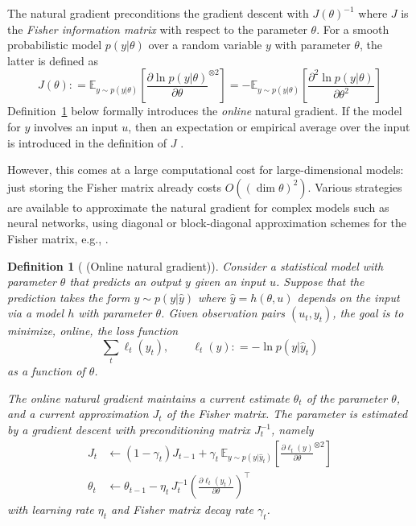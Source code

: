 \documentclass[11pt,a4paper]{article}
\newcommand{\deq}{\mathrel{\mathop{:}}=}
\newcommand{\E}{\mathbb{E}}
\newcommand{\1}{\mathbbm{1}}
\theoremstyle{yannthm}
\newtheorem{defi}{Definition}
\theoremstyle{yannthm2}
\newcommand{\transp}[1]{#1^{\!\top}\!}
\numberwithin{equation}{section}
\begin{document}
The natural gradient preconditions
the gradient descent with
$J(\theta)^{-1}$ where $J$ is the \emph{Fisher information matrix} 
\cite{Kullback} with
respect to the parameter $\theta$. For a smooth probabilistic model
$p(y|\theta)$ over a random variable $y$ with parameter $\theta$, the
latter
is defined as
\begin{equation}
J(\theta)\deq \E_{y\sim p(y|\theta)} \left[{\frac{\partial \ln
p(y|\theta)}{\partial \theta}}^{\otimes 2}\right]=-\E_{y\sim
p(y|\theta)}\left[
\frac{\partial^2\ln p(y|\theta)}{\partial \theta^2}\right]
\end{equation}
Definition~\ref{def:natgrad} below formally
introduces the \emph{online} natural gradient.
If the model for $y$ involves an input $u$, then an expectation or
empirical average over the input is introduced in the definition of $J$
\cite[\S8.2]{Amari2000book} \cite[\S5]{martensnatgrad}.

However, this comes at a large computational cost for large-dimensional
models: just storing the Fisher matrix already costs $O((\dim
\theta)^2)$. Various strategies are available to approximate the natural
gradient for complex models such as neural networks, using diagonal or
block-diagonal approximation schemes for the Fisher matrix, e.g.,
\cite{TONGA,gradnn,riemaNN,grosse2015scaling,martens2015optimizing}.

\begin{defi}[ (Online natural gradient)]
\label{def:natgrad}
Consider a statistical model with parameter $\theta$ that predicts an
output $y$ given an input $u$. Suppose that the prediction takes the form
$y\sim p(y|\hat y)$ where $\hat y=h(\theta,u)$ depends on the input via a
model $h$ with parameter $\theta$.
Given observation pairs $(u_t,y_t)$, the goal is to minimize, online, the loss function
\begin{equation}
\sum_t \ell_t(y_t), \qquad \ell_t(y)\deq -\ln p(y|\hat y_t)
\end{equation}
as a function of $\theta$.

The \emph{online natural gradient} maintains a current estimate
$\theta_t$ of the parameter $\theta$, and a current approximation $J_t$ of the
Fisher matrix. The parameter is estimated by a gradient descent with
preconditioning matrix $J_t^{-1}$, namely
\begin{align}
\label{eq:natgradJ}
J_t &\gets (1-\gamma_t) J_{t-1} + \gamma_t \,\E_{y\sim 
p(y|\hat y_t)} \left[\frac{\partial \ell_t(y)}{\partial
\theta}^{\otimes 2}\right]
\\
\label{eq:natgradtheta}
\theta_t &\gets \theta_{t-1} -\eta_t \, J_t^{-1}\transp{\left(
\frac{\partial \ell_t(y_t)}{\partial \theta}
\right)}
\end{align}
with learning rate $\eta_t$ and Fisher matrix decay rate $\gamma_t$.
\end{defi}
\end{document}
